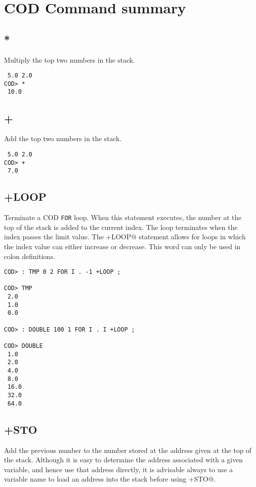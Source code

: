 \chapter{COD Command summary}
\label{codcommands}

\section*{*}
Multiply the top two numbers in the stack.

\medskip
{}
\begin{verbatim}
 5.0 2.0
COD> *
 10.0
\end{verbatim}

\section*{+}
Add the top two numbers in the stack.

\medskip
{}
\begin{verbatim}
 5.0 2.0
COD> +
 7.0
\end{verbatim}

\section*{+LOOP}
Terminate a COD {\tt FOR} loop.
When this statement executes,
the number at the top of the stack is added to the current index.
The loop terminates when the index passes the limit value.
The \verb@+LOOP@ statement allows for loops
in which the index value can either increase or decrease.
This word can only be used in colon definitions.

\medskip
{}
\begin{verbatim}
COD> : TMP 0 2 FOR I . -1 +LOOP ;

COD> TMP
 2.0
 1.0
 0.0

COD> : DOUBLE 100 1 FOR I . I +LOOP ;

COD> DOUBLE
 1.0
 2.0
 4.0
 8.0
 16.0
 32.0
 64.0
\end{verbatim}

\section*{+STO}
Add the previous number to the number stored
at the address given at the top of the stack.
Although it is easy to determine the address associated with a given variable,
and hence use that address directly,
it is advisable always to use a variable name
to load an address into the stack before using \verb@+STO@.

